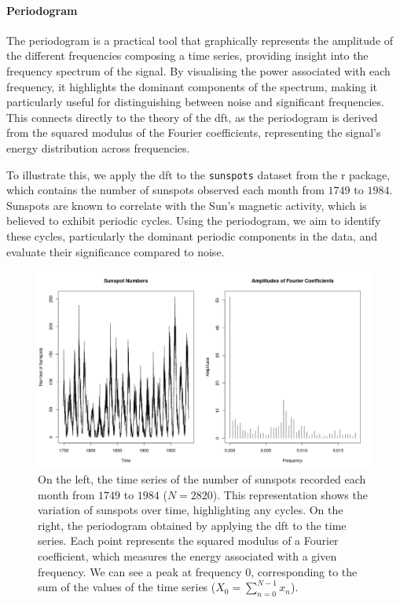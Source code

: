 \begin{modified}
\paragraph{Periodogram} The periodogram is a practical tool that graphically represents the amplitude of the different frequencies composing a time series, providing insight into the frequency spectrum of the signal. By visualising the power associated with each frequency, it highlights the dominant components of the spectrum, making it particularly useful for distinguishing between noise and significant frequencies. This connects directly to the theory of the \gls{dft}, as the periodogram is derived from the squared modulus of the Fourier coefficients, representing the signal's energy distribution across frequencies.

\noindent To illustrate this, we apply the \gls{dft} to the \texttt{sunspots} dataset from the \gls{r} package, which contains the number of sunspots observed each month from $1749$ to $1984$. Sunspots are known to correlate with the Sun's magnetic activity, which is believed to exhibit periodic cycles. Using the periodogram, we aim to identify these cycles, particularly the dominant periodic components in the data, and evaluate their significance compared to noise.
\begin{figure}[ht]
	\centering
	\includegraphics[width=\textwidth]{Figures/sunspots.png}
	\caption[Periodogram of sunspots]{On the left, the time series of the number of sunspots recorded each month from $1749$ to $1984$ (\(N = 2820\)). This representation shows the variation of sunspots over time, highlighting any cycles. On the right, the periodogram obtained by applying the \gls{dft} to the time series. Each point represents the squared modulus of a Fourier coefficient, which measures the energy associated with a given frequency. We can see a peak at frequency $0$, corresponding to the sum of the values of the time series (\(X_0 = \sum_{n=0}^{N-1} x_n\)).}
\end{figure}
\end{modified}

